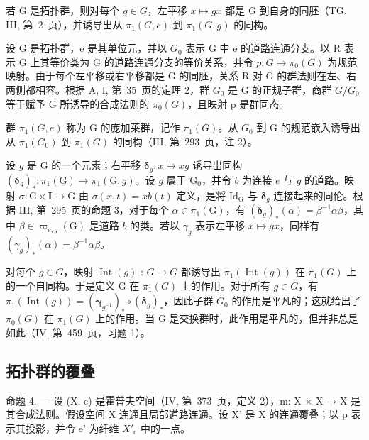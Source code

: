 若 G 是拓扑群，则对每个 \(g \in G\)，左平移 \(x \mapsto gx\) 都是 G 到自身的同胚（TG, III, 第~2~页），并诱导出从 \(\pi_{1}(G, e)\) 到 \(\pi_{1}(G, g)\) 的同构。

设 G 是拓扑群，e 是其单位元，并以 \(G_{0}\) 表示 G 中 e 的道路连通分支。以 R 表示 G 上其等价类为 G 的道路连通分支的等价关系，并令 \(p: G \to \pi_{0}(G)\) 为规范映射。由于每个左平移或右平移都是 G 的同胚，关系 R 对 G 的群法则在左、右两侧都相容。根据 A, I, 第~35~页的定理 2，群 \(G_{0}\) 是 G 的正规子群，商群 \(G/G_{0}\) 等于赋予 G 所诱导的合成法则的 \(\pi_{0}(G)\)，且映射 p 是群同态。

群 \(\pi_{1}(G,e)\) 称为 G 的庞加莱群，记作 \(\pi_{1}(G)\)。从 \(G_{0}\) 到 G 的规范嵌入诱导出从 \(\pi_{1}(G_{0})\) 到 \(\pi_{1}(G)\) 的同构（III, 第~293~页，注 2）。

设 \(g\) 是 G 的一个元素；右平移 \(\boldsymbol{\delta}_g \colon x \mapsto xg\) 诱导出同构 \((\boldsymbol{\delta}_g)_* \colon \pi_1(\mathrm{G}) \to \pi_1(\mathrm{G}, g)\)。设 \(g\) 属于 \(\mathrm{G}_0\)，并令 \(b\) 为连接 \(e\) 与 \(g\) 的道路。映射 \(\sigma \colon \mathrm{G} \times \mathbf{I} \to \mathrm{G}\) 由 \(\sigma(x, t) = xb(t)\) 定义，是将 \(\mathrm{Id}_{\mathrm{G}}\) 与 \(\boldsymbol{\delta}_g\) 连接起来的同伦。根据 III, 第~295~页的命题 3，对于每个 \(\alpha \in \pi_1(\mathrm{G})\)，有 \((\boldsymbol{\delta}_g)_*(\alpha) = \beta^{-1}\alpha\beta\)，其中 \(\beta \in \varpi_{e,g}(\mathrm{G})\) 是道路 \(b\) 的类。若以 \(\gamma_g\) 表示左平移 \(x \mapsto gx\)，同样有 \((\gamma_g)_*(\alpha) = \beta^{-1}\alpha\beta\)。

对每个 \(g \in G\)，映射 \(\operatorname{Int}(g)\) : \(G \to G\) 都诱导出 \(\pi_{1}(\operatorname{Int}(g))\) 在 \(\pi_{1}(G)\) 上的一个自同构。于是定义 G 在 \(\pi_{1}(G)\) 上的作用。对于所有 \(g \in G\)，有 \(\pi_{1}(\operatorname{Int}(g)) = (\boldsymbol{\gamma}_{g^{-1}})_{*} \circ (\boldsymbol{\delta}_{g})_{*}\)，因此子群 \(G_{0}\) 的作用是平凡的；这就给出了 \(\pi_{0}(G)\) 在 \(\pi_{1}(G)\) 上的作用。当 G 是交换群时，此作用是平凡的，但并非总是如此（IV, 第~459~页，习题 1）。

\subsection{拓扑群的覆叠}

命题 4. --- 设 (X, e) 是霍普夫空间（IV, 第~373~页，定义 2），m: X × X → X 是其合成法则。假设空间 X 连通且局部道路连通。设 X' 是 X 的连通覆叠；以 p 表示其投影，并令 e' 为纤维 \(X'_{e}\) 中的一点。

